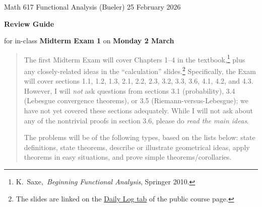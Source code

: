 \documentclass[12pt]{amsart}
\newcommand{\textbook}{K.~Saxe,~\emph{Beginning Functional Analysis}, Springer 2010.}
\begin{document}
\scriptsize \noindent Math 617 Functional Analysis (Bueler) \hfill 25 February 2026
\thispagestyle{empty}

\bigskip
\LARGE\centerline{\textbf{Review Guide}}

\medskip
\Large\centerline{for in-class \textbf{Midterm Exam 1} on \textbf{Monday 2 March}}

\normalsize
\bigskip
\begin{quote}
The first Midterm Exam will cover Chapters 1--4 in the textbook,\footnote{\textbook} plus any closely-related ideas in the ``calculation'' slides.\footnote{The slides are linked on the \href{https://bueler.github.io/fa/daily.html}{Daily Log tab} of the public course page.}  Specifically, the Exam will cover sections 1.1, 1.2, 1.3, 2.1, 2.2, 2.3, 3.2, 3.3, 3.6, 4.1, 4.2, and 4.3.
However, I will \emph{not} ask questions from sections 3.1 (probability), 3.4 (Lebesgue convergence theorems), or 3.5 (Riemann-versus-Lebesgue); we have not yet covered these sections adequately.  While I will not ask about any of the nontrivial proofs in section 3.6, please do \emph{read the main ideas}.

The problems will be of the following types, based on the lists below: state definitions, state theorems, describe or illustrate geometrical ideas, apply theorems in easy situations, and prove simple theorems/corollaries.
\end{quote}
\bigskip
\end{document}
